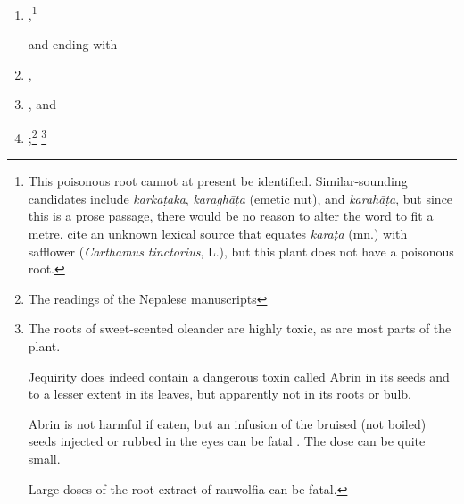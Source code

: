 \begin{translation}
\begin{itemize}
\begin{enumerate}

        \item {},\footnote{This poisonous root cannot at present
be identified.  Similar-sounding candidates include \emph{karkaṭaka},
\emph{karaghāṭa} (emetic nut), and \emph{karahāṭa}, but since this is a
prose passage, there would be no reason to alter the word to fit a metre.
\citet[255]{moni-sans} cite an unknown lexical source that equates
\emph{karaṭa} (mn.) with safflower (\emph{Carthamus tinctorius}, L.), but
this plant does not have a poisonous root.}


%        



  and ending with
        \item {},
        \item {},
        and 
        \item {};\footnote{The readings of the Nepalese 
        manuscripts}%
        \footnote{The roots of sweet-scented oleander are highly toxic, as
        are most parts of the plant.  
        
        Jequirity does indeed contain a dangerous
        toxin called Abrin in its seeds and to a lesser extent in its leaves,
        but apparently not in its roots or bulb.  
        
        Abrin is not harmful if eaten,
        but an infusion of the bruised (not boiled) seeds injected or rubbed in
        the eyes can be fatal \citep[no.\,6]{NK}.  The dose can be quite small.
        
        Large doses of the root-extract of rauwolfia can be fatal. 
        
}
\end{enumerate}
\end{itemize}
\end{translation}
